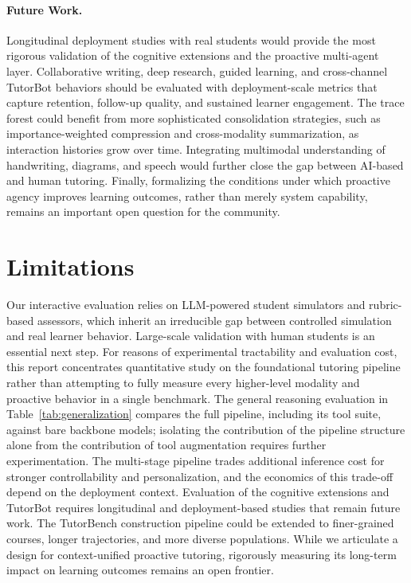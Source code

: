 \paragraph{Future Work.}
Longitudinal deployment studies with real students would provide the most rigorous validation of the cognitive extensions and the proactive multi-agent layer.
Collaborative writing, deep research, guided learning, and cross-channel TutorBot behaviors should be evaluated with deployment-scale metrics that capture retention, follow-up quality, and sustained learner engagement.
The trace forest could benefit from more sophisticated consolidation strategies, such as importance-weighted compression and cross-modality summarization, as interaction histories grow over time.
Integrating multimodal understanding of handwriting, diagrams, and speech would further close the gap between AI-based and human tutoring.
Finally, formalizing the conditions under which proactive agency improves learning outcomes, rather than merely system capability, remains an important open question for the community.

\section*{Limitations}

Our interactive evaluation relies on LLM-powered student simulators and rubric-based assessors, which inherit an irreducible gap between controlled simulation and real learner behavior.
Large-scale validation with human students is an essential next step.
For reasons of experimental tractability and evaluation cost, this report concentrates quantitative study on the foundational tutoring pipeline rather than attempting to fully measure every higher-level modality and proactive behavior in a single benchmark.
The general reasoning evaluation in Table~\ref{tab:generalization} compares the full pipeline, including its tool suite, against bare backbone models; isolating the contribution of the pipeline structure alone from the contribution of tool augmentation requires further experimentation.
The multi-stage pipeline trades additional inference cost for stronger controllability and personalization, and the economics of this trade-off depend on the deployment context.
Evaluation of the cognitive extensions and TutorBot requires longitudinal and deployment-based studies that remain future work.
The TutorBench construction pipeline could be extended to finer-grained courses, longer trajectories, and more diverse populations.
While we articulate a design for context-unified proactive tutoring, rigorously measuring its long-term impact on learning outcomes remains an open frontier.
